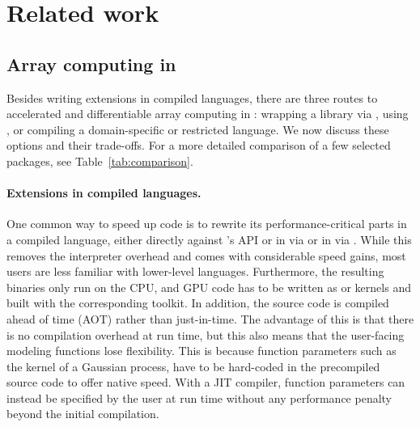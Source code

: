 \documentclass[article,shortnames]{jss}
\begin{document}
\section{Related work}\label{related-work}

\subsection[Array computing in R]{Array computing in }\label{in-r}

Besides writing extensions in compiled languages, there are three routes to accelerated and differentiable array computing in : wrapping a  library via  \citep{ref-reticulate}, using , or compiling a domain-specific or restricted language.
We now discuss these options and their trade-offs.
For a more detailed comparison of a few selected packages, see Table~\ref{tab:comparison}.

\paragraph{Extensions in compiled languages.}
One common way to speed up  code is to rewrite its performance-critical parts in a compiled language, either directly against 's  API \citep{ref-r-exts} or in  via  \citep{ref-rcpp} or in  via  \citep{ref-rextendr}.
While this removes the interpreter overhead and comes with considerable speed gains, most  users are less familiar with lower-level languages.
Furthermore, the resulting binaries only run on the CPU, and GPU code has to be written as  or  kernels and built with the corresponding toolkit.
In addition, the source code is compiled ahead of time (AOT) rather than just-in-time.
The advantage of this is that there is no compilation overhead at run time, but this also means that the user-facing modeling functions lose flexibility.
This is because function parameters such as the kernel of a Gaussian process, have to be hard-coded in the precompiled source code to offer native speed.
With a JIT compiler, function parameters can instead be specified by the user at run time without any performance penalty beyond the initial compilation.
\end{document}
